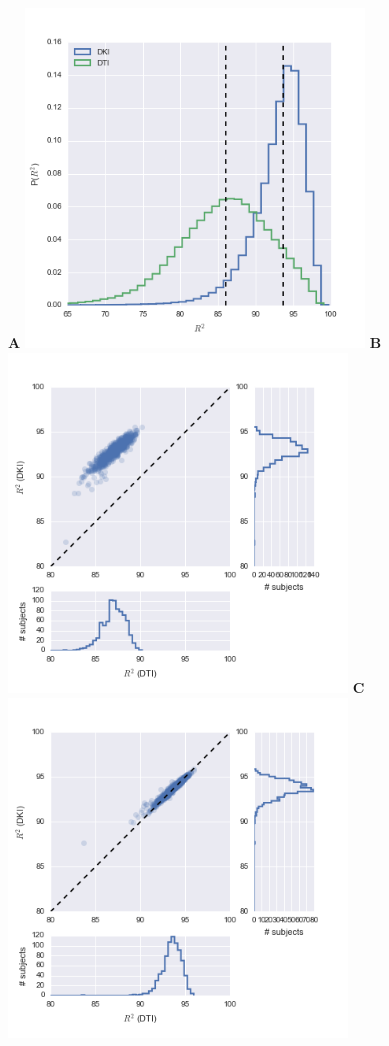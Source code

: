 \documentclass[a0, landscape]{a0poster}
\begin{document}
\begin{multicols}{3}
\begin{minipage}[b]{1\linewidth}
  \large
  \textbf{A}
  \includegraphics[width=9cm]{histogram_cod_dki_dti.png}
  \textbf{B}
  \includegraphics[width=9cm]{dti_dki.png}
  \textbf{C}
  \includegraphics[width=9cm]{dti_1000_dki.png}
\end{minipage}


\end{multicols}
\end{document}
